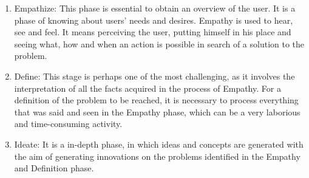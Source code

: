 \documentclass[conference]{IEEEtran}
\begin{document}
\begin{enumerate}


\item Empathize: This phase is essential to obtain an overview of the user. It is a phase of knowing about users' needs and desires. Empathy is used to hear, see and feel. It means perceiving the user, putting himself in his place and seeing what, how and when an action is possible in search of a solution to the problem.


\item Define: This stage is perhaps one of the most challenging, as it involves the interpretation of all the facts acquired in the process of Empathy. For a definition of the problem to be reached, it is necessary to process everything that was said and seen in the Empathy phase, which can be a very laborious and time-consuming activity.


\item Ideate: It is a in-depth phase, in which ideas and concepts are generated with the aim of generating innovations on the problems identified in the Empathy and Definition phase.



\end{enumerate}
\end{document}
